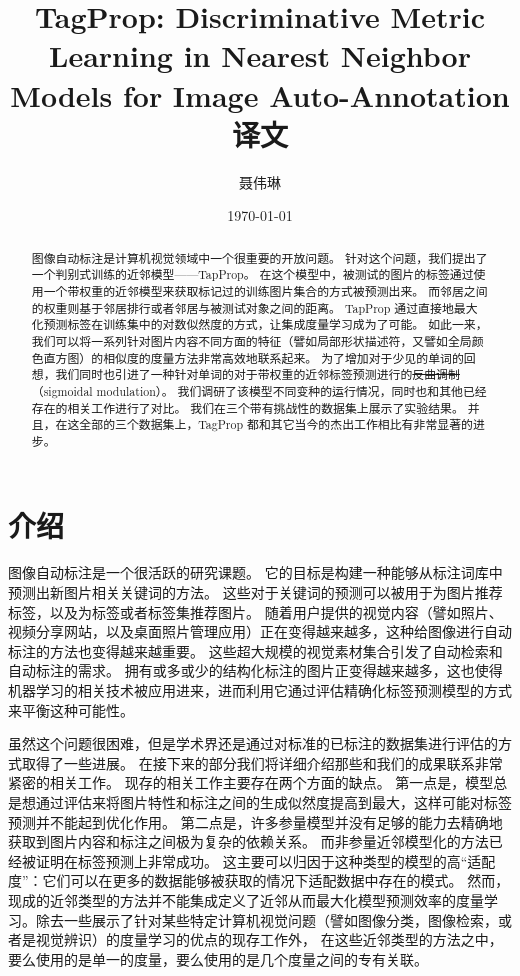 \documentclass[a4paper,twocolumn]{ctexart}
\title{TagProp: Discriminative Metric Learning in Nearest Neighbor Models for Image Auto-Annotation 译文}
\author{聂伟琳}
\date{\today}
\begin{document}
\maketitle

\begin{abstract}

图像自动标注是计算机视觉领域中一个很重要的开放问题。
针对这个问题，我们提出了一个判别式训练的近邻模型——TapProp。
在这个模型中，被测试的图片的标签通过使用一个带权重的近邻模型来获取标记过的训练图片集合的方式被预测出来。
而邻居之间的权重则基于邻居排行或者邻居与被测试对象之间的距离。
TapProp 通过直接地最大化预测标签在训练集中的对数似然度的方式，让集成度量学习成为了可能。
如此一来，我们可以将一系列针对图片内容不同方面的特征（譬如局部形状描述符，又譬如全局颜色直方图）的相似度的度量方法非常高效地联系起来。
为了增加对于少见的单词的回想，我们同时也引进了一种针对单词的对于带权重的近邻标签预测进行的\sout{反曲调制}（sigmoidal modulation）。
我们调研了该模型不同变种的运行情况，同时也和其他已经存在的相关工作进行了对比。
我们在三个带有挑战性的数据集上展示了实验结果。
并且，在这全部的三个数据集上，TagProp 都和其它当今的杰出工作相比有非常显著的进步。

\end{abstract}

\section{介绍}

图像自动标注是一个很活跃的研究课题\cite{7,15,16,18}。
它的目标是构建一种能够从标注词库中预测出新图片相关关键词的方法。
这些对于关键词的预测可以被用于为图片推荐标签，以及为标签或者标签集推荐图片。
随着用户提供的视觉内容（譬如照片、视频分享网站，以及桌面照片管理应用）正在变得越来越多，这种给图像进行自动标注的方法也变得越来越重要。
这些超大规模的视觉素材集合引发了自动检索和自动标注的需求。
拥有或多或少的结构化标注的图片正变得越来越多，这也使得机器学习的相关技术被应用进来，进而利用它通过评估精确化标签预测模型的方式来平衡这种可能性。

虽然这个问题很困难，但是学术界还是通过对标准的已标注的数据集进行评估的方式取得了一些进展。
在接下来的部分我们将详细介绍那些和我们的成果联系非常紧密的相关工作。
现存的相关工作主要存在两个方面的缺点。
第一点是，模型总是想通过评估来将图片特性和标注之间的生成似然度提高到最大，这样可能对标签预测并不能起到优化作用。
第二点是，许多参量模型并没有足够的能力去精确地获取到图片内容和标注之间极为复杂的依赖关系。
而非参量近邻模型化的方法已经被证明在标签预测上非常成功\cite{5,11,13,17,22,27}。
这主要可以归因于这种类型的模型的高“适配度”：它们可以在更多的数据能够被获取的情况下适配数据中存在的模式。
然而，现成的近邻类型的方法并不能集成定义了近邻从而最大化模型预测效率的度量学习。除去一些展示了针对某些特定计算机视觉问题（譬如图像分类\cite{12}，图像检索\cite{10}，或者是视觉辨识\cite{9}）的度量学习的优点的现存工作外， 在这些近邻类型的方法之中，要么使用的是单一的度量\cite{5,27}，要么使用的是几个度量之间的专有关联\cite{17}。
\end{document}
